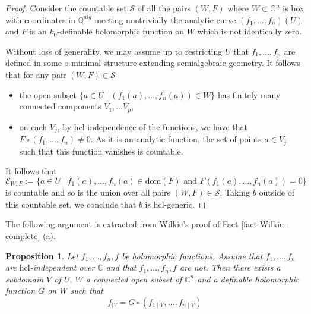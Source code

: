 \documentclass[12pt]{amsart}
\theoremstyle{definition}
\theoremstyle{plain}
\newtheorem{Prop}[defn]{Proposition}
\theoremstyle{exampstyle}\newtheorem{thmx}{Theorem}
\theoremstyle{exampstyle}\newtheorem{thmxbis}{Theorem}
\begin{document}
\begin{proof} 
Consider the countable set $\mathcal S$ of all the pairs $(W,F)$ where $W \subset \mathbb{C}^n$ is box with coordinates in $\mathbb{Q}^{alg}$ meeting nontrivially the analytic curve  $(f_1,\ldots,f_n)(U)$ and $F$ is an $k_0$-definable holomorphic function on $W$ which is not identically zero.

Without loss of generality, we may assume up to restricting $U$ that $f_1,\ldots,f_n$ are defined in some o-minimal structure extending semialgebraic geometry. It follows that for any pair $(W,F) \in \mathcal S$
\begin{itemize} 
\item the open subset $\lbrace a \in U \mid (f_1(a),\ldots, f_n(a)) \in W \rbrace$ has finitely many connected components $V_1,\ldots V_p$,
\item on each $V_j$, by $\mathrm{hcl}$-independence of the functions, we have that $F \circ (f_1,\ldots,f_n) \neq 0$. As it is an analytic function, the set of points $a \in V_j$ such that this function vanishes is countable. 
\end{itemize}
It follows that 
$$\mathcal E_{W,F} := \lbrace a \in U \mid f_1(a),\ldots, f_n(a) \in \mathrm{dom}(F) \text{ and } F(f_1(a),\ldots,f_n(a)) = 0 \rbrace$$
is countable and so is the union over all pairs $(W,F) \in \mathcal S$. Taking $b$ outside of this countable set, we conclude that $b$ is $\mathrm{hcl}$-generic.
\end{proof}  


The following argument is extracted from Wilkie's proof of Fact \ref{fact-Wilkie-complete} (a). 

\begin{Prop} \label{prop-from relation to functions}
Let $f_1,\ldots,f_n,f$ be holomorphic functions. Assume that $f_1,\ldots,f_n$ are $\mathrm{hcl}$-independent over $\mathbb{C}$ and that $f_1,\ldots,f_n,f$ are not. Then there exists a subdomain $V$ of $U$, $W$ a connected open subset of $\mathbb{C}^n$ and a definable holomorphic function $G$ on $W$ such that
$$ f_{\mid V} = G \circ (f_{1 \mid V},\ldots,f_{n \mid V}) $$
\end{Prop}
\end{document}
